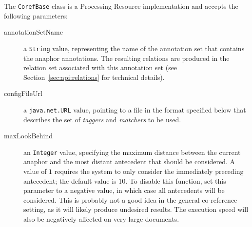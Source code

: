 The \lstinline!CorefBase! class is a Processing Resource implementation and
accepts the following parameters:
\begin{description}
\item[annotationSetName] a \lstinline!String! value, representing the name of
  the annotation set that contains the anaphor annotations. The resulting
  relations are produced in the relation set associated with this annotation set
  (see Section~\ref{sec:api:relations} for technical details).
\item[configFileUrl] a \lstinline!java.net.URL! value, pointing to a file in the
  format specified below that describes the set of {\em taggers} and {\em
  matchers} to be used.
\item[maxLookBehind] an \lstinline!Integer! value, specifying the maximum
  distance between the current anaphor and the most distant antecedent that
  should be considered. A value of $1$ requires the system to only consider the
  immediately preceding antecedent; the default value is $10$. To disable this
  function, set this parameter to a negative value, in which case all
  antecedents will be considered. This is probably not a good idea in the
  general co-reference setting, as it will likely produce undesired results.
  The execution speed will also be negatively affected on very large documents. 
\end{description}

